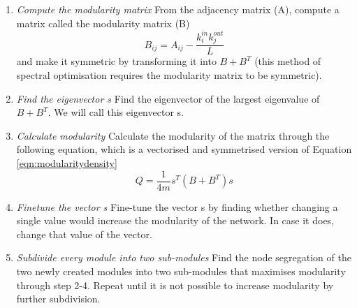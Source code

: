 \documentclass[twocolumn]{article}
\begin{document}
        \begin{enumerate}
            \item \emph{Compute the modularity matrix} \smallskip \newline
            From the adjacency matrix (A), compute a matrix called the modularity matrix (B)
            \begin{equation}
                B_{ij}=A_{ij}-\frac{k_i^{in}k_j^{out}}{L} 
            \end{equation}
            and make it symmetric by transforming it into $B+B^T$ (this method of spectral optimisation requires the modularity matrix to be symmetric). 
            \item \emph{Find the eigenvector s} \smallskip \newline
            Find the eigenvector of the largest eigenvalue of $B+B^T$. We will call this eigenvector s.
            \item \emph{Calculate modularity} \smallskip \newline
            Calculate the modularity of the matrix through the following equation, which is a vectorised and symmetrised version of Equation \ref{eqn:modularitydensity} 
            \begin{equation}
                Q=\frac{1}{4m}s^T(B+B^T)s
            \end{equation}
            \item \emph{Finetune the vector s} \smallskip \newline
            Fine-tune the vector s by finding whether changing a single value would increase the modularity of the network. In case it does, change that value of the vector.
            \item \emph{Subdivide every module into two sub-modules} \smallskip \newline 
            Find the node segregation of the two newly created modules into two sub-modules that maximises modularity through step 2-4. Repeat until it is not possible to increase modularity by further subdivision.
        \end{enumerate}
\end{document}
